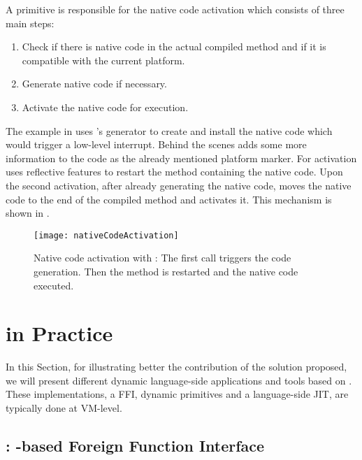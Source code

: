 A \B primitive is responsible for the native code activation which consists of three main steps:
%
\begin{enumerate}
	\item Check if there is native code in the actual compiled method and if it is compatible with the current platform.
	\item Generate native code if necessary.
	\item Activate the native code for execution.
\end{enumerate}
%
The example in  uses \B's generator to create and install the native code which would trigger a low-level interrupt. Behind the scenes \B adds some more information to the code as the already mentioned platform marker. 
For activation \B uses reflective features to restart the method containing the native code.
Upon the second activation, after already generating the native code, \B moves the native code to the end of the compiled method and activates it.
This mechanism is shown in .

\begin{figure}[ht]
	\centering
	\texttt{[image: nativeCodeActivation]}
	\caption[\B Native Code Acivation]{Native code activation with \B: The first call triggers the code generation. Then the method is restarted and the native code executed.}
\end{figure}

\section{\B in Practice}

In this Section, for illustrating better the contribution of the solution proposed, we will present different dynamic language-side applications and tools based on \B.
These implementations, a FFI, dynamic primitives and a language-side JIT, are typically done at VM-level.

\subsection{\NB: \B-based Foreign Function Interface}

